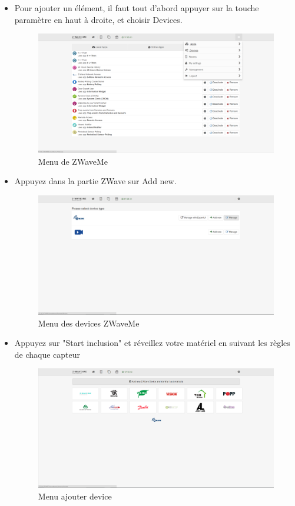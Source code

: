 \begin{itemize}

\item Pour ajouter un élément, il faut tout d'abord appuyer sur la touche paramètre en haut à droite, et choisir Devices.

\begin{figure}[h!]
	\center
	\includegraphics[scale=0.4]{./Images/png/menu_zwaveme.png}
	\caption{Menu de ZWaveMe}
\end{figure}
\clearpage

\item Appuyez dans la partie ZWave sur Add new.


\begin{figure}[h!]
	\center
	\includegraphics[scale=0.4]{./Images/png/devices_zwaveme.png}
	\caption{Menu des devices ZWaveMe}
\end{figure}
\clearpage


\item Appuyez sur "Start inclusion" et réveillez votre matériel en suivant les règles de chaque capteur

\begin{figure}[h]
	\center
	\includegraphics[scale=0.4]{./Images/png/add_zwaveme.png}
	\caption{Menu ajouter device}
\end{figure}
\clearpage


\end{itemize}
